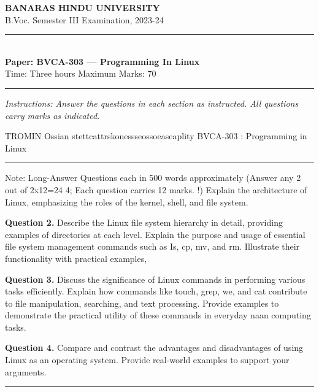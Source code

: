 \documentclass[11pt,a4paper]{article}
\begin{document}
\begin{center}
  {\large\bfseries BANARAS HINDU UNIVERSITY}\\[2pt]
  {\normalsize B.Voc. Semester III Examination, 2023-24}\\[6pt]
  \rule{0.8\linewidth}{0.5pt}\\[6pt]
  {\large\bfseries Paper: BVCA-303 --- Programming In Linux}\\[4pt]
  {\normalsize Time: Three hours \hfill Maximum Marks: 70}
\end{center}

\rule{\linewidth}{0.4pt}

\smallskip
\noindent\textit{Instructions: Answer the questions in each section as instructed. All questions carry marks as indicated.}

\bigskip

TROMIN Ossian stettcattrskonessseossoeaseaplity
BVCA-303 : Programming in Linux

\bigskip{}
\rule{\linewidth}{0.4pt}\smallskip

Note: Long-Answer Questions each in 500 words approximately (Answer any 2 out of 2x12=24
4; Each question carries 12 marks.
!) Explain the architecture of Linux, emphasizing the roles of the kernel, shell, and file system.

\medskip\noindent\textbf{Question 2.} Describe the Linux file system hierarchy in detail, providing examples of directories at each level.
Explain the purpose and usage of essential file system management commands such as Is, cp, mv, and
rm. Illustrate their functionality with practical examples,

\medskip\noindent\textbf{Question 3.} Discuss the significance of Linux commands in performing various tasks efficiently. Explain how
commands like touch, grep, we, and cat contribute to file manipulation, searching, and text
processing. Provide examples to demonstrate the practical utility of these commands in everyday naan
computing tasks.

\medskip\noindent\textbf{Question 4.} Compare and contrast the advantages and disadvantages of using Linux as an operating system.
Provide real-world examples to support your arguments.

\bigskip{}
\rule{\linewidth}{0.4pt}\smallskip
\end{document}
